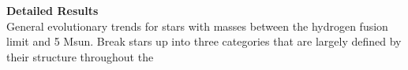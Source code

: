 \textbf{Detailed Results} \\
General evolutionary trends for stars with masses between the hydrogen fusion limit and 5 Msun. Break stars up into three categories that are largely defined by their structure throughout the
